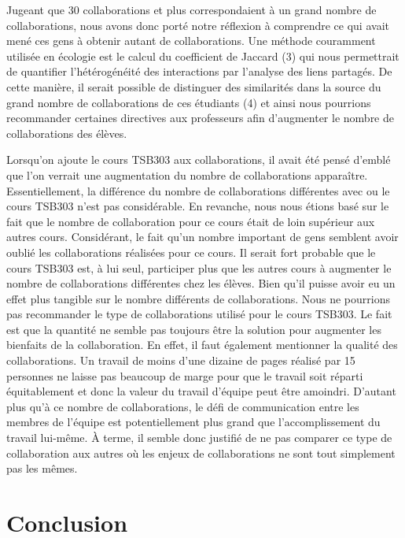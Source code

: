 \documentclass[9pt,twocolumn,twoside,]{pnas-new}
\begin{document}
Jugeant que 30 collaborations et plus correspondaient à un grand nombre
de collaborations, nous avons donc porté notre réflexion à comprendre ce
qui avait mené ces gens à obtenir autant de collaborations. Une méthode
couramment utilisée en écologie est le calcul du coefficient de Jaccard
(3) qui nous permettrait de quantifier l'hétérogénéité des interactions
par l'analyse des liens partagés. De cette manière, il serait possible
de distinguer des similarités dans la source du grand nombre de
collaborations de ces étudiants (4) et ainsi nous pourrions recommander
certaines directives aux professeurs afin d'augmenter le nombre de
collaborations des élèves.

Lorsqu'on ajoute le cours TSB303 aux collaborations, il avait été pensé
d'emblé que l'on verrait une augmentation du nombre de collaborations
apparaître. Essentiellement, la différence du nombre de collaborations
différentes avec ou le cours TSB303 n'est pas considérable. En revanche,
nous nous étions basé sur le fait que le nombre de collaboration pour ce
cours était de loin supérieur aux autres cours. Considérant, le fait
qu'un nombre important de gens semblent avoir oublié les collaborations
réalisées pour ce cours. Il serait fort probable que le cours TSB303
est, à lui seul, participer plus que les autres cours à augmenter le
nombre de collaborations différentes chez les élèves. Bien qu'il puisse
avoir eu un effet plus tangible sur le nombre différents de
collaborations. Nous ne pourrions pas recommander le type de
collaborations utilisé pour le cours TSB303. Le fait est que la quantité
ne semble pas toujours être la solution pour augmenter les bienfaits de
la collaboration. En effet, il faut également mentionner la qualité des
collaborations. Un travail de moins d'une dizaine de pages réalisé par
15 personnes ne laisse pas beaucoup de marge pour que le travail soit
réparti équitablement et donc la valeur du travail d'équipe peut être
amoindri. D'autant plus qu'à ce nombre de collaborations, le défi de
communication entre les membres de l'équipe est potentiellement plus
grand que l'accomplissement du travail lui-même. À terme, il semble donc
justifié de ne pas comparer ce type de collaboration aux autres où les
enjeux de collaborations ne sont tout simplement pas les mêmes.

\hypertarget{conclusion}{%
\section{Conclusion}\label{conclusion}}
\end{document}
